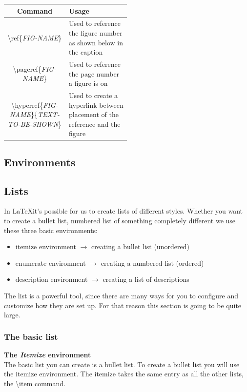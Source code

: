 \documentclass{article}
\newcommand{\jbs}[1]{\textbackslash{}#1} %
\begin{document}
\begin{table}[h]
    \centering
    \begin{tabular}{|c|p{0.50\linewidth}|}
        \hline
        \rowcolor{gray!30}
        Command & Usage \\
        \hline
        \jbs{ref\{\textit{FIG-NAME}\}} & Used to reference the figure number as shown below in the caption \\
        \hline
        \jbs{pageref\{\textit{FIG-NAME}\}} & Used to reference the page number a figure is on \\
        \hline
        \jbs{hyperref\{\textit{FIG-NAME}\}\{\textit{TEXT-TO-BE-SHOWN}\}} & Used to create a hyperlink between placement of the reference
         and the figure \\
        \hline
    \end{tabular}
\end{table}



\subsection{Environments}

\subsection{Lists}
In \LaTeX it's possible for us to create lists of different styles. Whether you want to create a bullet list, numbered list of something completely different 
we use these three basic environments:

\begin{itemize}
    \item itemize environment $\rightarrow$ creating a bullet list (unordered)
    \item enumerate environment $\rightarrow$ creating a numbered list (ordered)
    \item description environment $\rightarrow$ creating a list of descriptions 
\end{itemize}

The list is a powerful tool, since there are many ways for you to configure and customize how they are
set up. For that reason this section is going to be quite large. 

\subsubsection{The basic list}
\textbf{The \textit{Itemize} environment} \\
The basic list you can create is a bullet list. To create a bullet list you will use the itemize environment.
The itemize takes the same entry as all the other lists, the \jbs{item} command.
\end{document}
